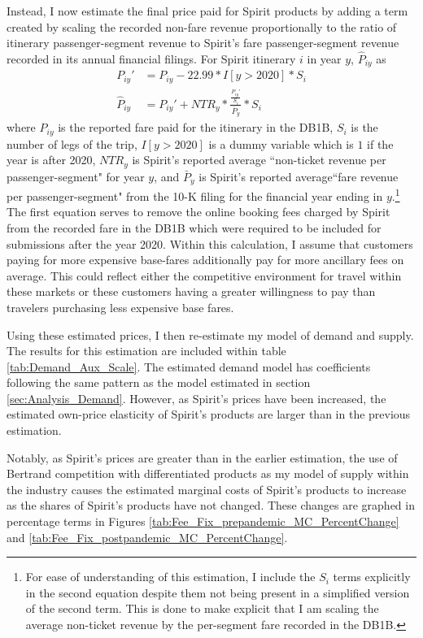 \documentclass{article}
\begin{document}
    Instead, I now estimate the final price paid for Spirit products by adding a term created by scaling the recorded non-fare revenue proportionally to the ratio of itinerary passenger-segment revenue to Spirit's fare passenger-segment revenue recorded in its annual financial filings. For Spirit itinerary $i$ in year $y$, $\hat{P}_{iy} $ as \begin{equation}
    \begin{split}
      P_{iy}' &= P_{iy} - 22.99 * I[y > 2020] * S_{i}\\
     \hat{P}_{iy} &= P_{iy}' + NTR_{y} * \frac{\frac{P_{iy}'}{S_{i}}}{\bar{P}_{y}} * S_{i}
    \end{split}
    \end{equation} where ${P}_{iy}$ is the reported fare paid for the itinerary in the DB1B, $S_{i}$ is the number of legs of the trip, $I[y > 2020]$ is a dummy variable which is $1$ if the year is after 2020, $NTR_{y}$ is Spirit's reported average ``non-ticket revenue per passenger-segment" for year $y$, and $\bar{P}_{y}$ is Spirit's reported average``fare revenue per passenger-segment" from the 10-K filing for the financial year ending in $y$.\footnote{For ease of understanding of this estimation, I include the $S_{i}$ terms explicitly in the second equation despite them not being present in a simplified version of the second term. This is done to make explicit that I am scaling the average non-ticket revenue by the per-segment fare recorded in the DB1B. } The first equation serves to remove the online booking fees charged by Spirit from the recorded fare in the DB1B which were required to be included for submissions after the year 2020. Within this calculation, I assume that customers paying for more expensive base-fares additionally pay for more ancillary fees on average. This could reflect either the competitive environment for travel within these markets or these customers having a greater willingness to pay than travelers purchasing less expensive base fares. 

    Using these estimated prices, I then re-estimate my model of demand and supply. The results for this estimation are included within table \ref{tab:Demand_Aux_Scale}. The estimated demand model has coefficients following the same pattern as the model estimated in section \ref{sec:Analysis_Demand}. However, as Spirit's prices have been increased, the estimated own-price elasticity of Spirit's products are larger than in the previous estimation. 

    Notably, as Spirit's prices are greater than in the earlier estimation, the use of Bertrand competition with differentiated products as my model of supply within the industry causes the estimated marginal costs of Spirit's products to increase as the shares of Spirit's products have not changed. These changes are graphed in percentage terms in Figures  \ref{tab:Fee_Fix_prepandemic_MC_PercentChange} and    \ref{tab:Fee_Fix_postpandemic_MC_PercentChange}.
\end{document}
